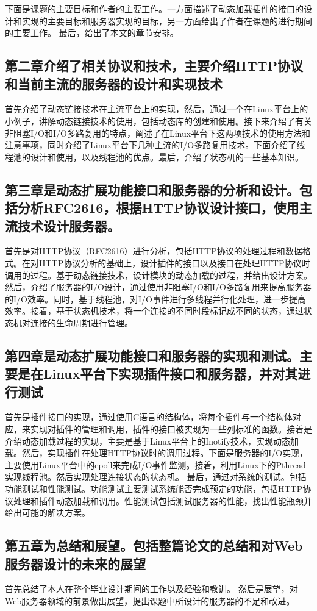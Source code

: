 \documentclass[12pt, twoside, a4paper, xetex]{report}
\begin{document}
	下面是课题的主要目标和作者的主要工作。一方面描述了动态加载插件的接口的设计和实现的主要目标和服务器实现的目标，另一方面给出了作者在课题的进行期间的主要工作。
	最后，给出了本文的章节安排。
	
	\subsection*{第二章介绍了相关协议和技术，主要介绍HTTP协议和当前主流的服务器的设计和实现技术}
		首先介绍了动态链接技术在主流平台上的实现，然后，通过一个在Linux平台上的小例子，讲解动态链接技术的使用，包括动态库的创建和使用。接下来介绍了有关非阻塞I/O和I/O多路复用的特点，阐述了在Linux平台下这两项技术的使用方法和注意事项，同时介绍了Linux平台下几种主流的I/O多路复用技术。下面介绍了线程池的设计和使用，以及线程池的优点。最后，介绍了状态机的一些基本知识。
		
	\subsection*{第三章是动态扩展功能接口和服务器的分析和设计。包括分析RFC2616，根据HTTP协议设计接口，使用主流技术设计服务器。}
		首先是对HTTP协议（RFC2616）进行分析，包括HTTP协议的处理过程和数据格式。在对HTTP协议分析的基础上，设计插件的接口以及接口在处理HTTP协议时调用的过程。基于动态链接技术，设计模块的动态加载的过程，并给出设计方案。
		然后，介绍了服务器的I/O设计，通过使用非阻塞I/O和I/O多路复用来提高服务器的I/O效率。同时，基于线程池，对I/O事件进行多线程并行化处理，进一步提高效率。接着，基于状态机技术，将一个连接的不同时段标记成不同的状态，通过状态机对连接的生命周期进行管理。
	
	\subsection*{第四章是动态扩展功能接口和服务器的实现和测试。主要是在Linux平台下实现插件接口和服务器，并对其进行测试}
		首先是插件接口的实现，通过使用C语言的结构体，将每个插件与一个结构体对应，来实现对插件的管理和调用，插件的接口被实现为一些列标准的函数。接着是介绍动态加载过程的实现，主要是基于Linux平台上的Inotify技术，实现动态加载。然后，实现插件在处理HTTP协议时的调用过程。下面是服务器的I/O实现，主要使用Linux平台中的epoll来完成I/O事件监测。接着，利用Linux下的Pthread实现线程池。然后实现处理连接状态的状态机。
		最后，通过对系统的测试。包括功能测试和性能测试。功能测试主要测试系统能否完成预定的功能，包括HTTP协议处理和插件动态加载和调用。性能测试包括测试服务器的性能，找出性能瓶颈并给出可能的解决方案。
	\subsection*{第五章为总结和展望。包括整篇论文的总结和对Web服务器设计的未来的展望}
		首先总结了本人在整个毕业设计期间的工作以及经验和教训。
		然后是展望，对Web服务器领域的前景做出展望，提出课题中所设计的服务器的不足和改进。
	
\end{document}
